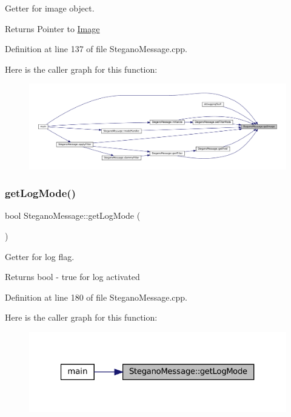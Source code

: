 Getter for image object. 

\begin{DoxyReturn}{Returns}
Pointer to \mbox{\hyperlink{classImage}{Image}} 
\end{DoxyReturn}


Definition at line 137 of file Stegano\+Message.\+cpp.

Here is the caller graph for this function\+:\nopagebreak
\begin{figure}[H]
\begin{center}
\leavevmode
\includegraphics[width=350pt]{classSteganoMessage_a2e3ad705a0219edfd2150f3f7931979c_icgraph}
\end{center}
\end{figure}
\mbox{\label{classSteganoMessage_ab560ec6c0d3e99c19822ca1119a68b92}} 
\subsubsection{\texorpdfstring{getLogMode()}{getLogMode()}}
{\footnotesize\ttfamily bool Stegano\+Message\+::get\+Log\+Mode (\begin{DoxyParamCaption}{ }\end{DoxyParamCaption})}



Getter for log flag. 

\begin{DoxyReturn}{Returns}
bool -\/ true for log activated 
\end{DoxyReturn}


Definition at line 180 of file Stegano\+Message.\+cpp.

Here is the caller graph for this function\+:\nopagebreak
\begin{figure}[H]
\begin{center}
\leavevmode
\includegraphics[width=321pt]{classSteganoMessage_ab560ec6c0d3e99c19822ca1119a68b92_icgraph}
\end{center}
\end{figure}
\mbox{\label{classSteganoMessage_ad29978e925056ad70dc5c45b1e1681eb}} 
